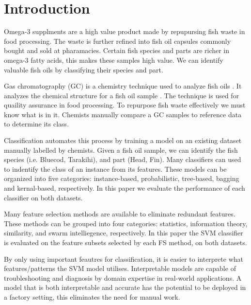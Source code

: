\documentclass[runningheads]{llncs}
\begin{document}
\section{Introduction}
\label{introduction}


Omega-3 supplments are a high value product made by repupursing fish waste in food processing. 
The waste is further refined into fish oil capsules commonly bought and sold at pharamacies. 
Certain fish species and parts are richer in omega-3 fatty acids, this makes these samples high value. 
We can identify valuable fish oils by classifying their species and part.

Gas chromatography (GC) is a chemistry technique used to analyze fish oils \cite{eder1995gas}. 
It analyzes the chemical structure for a fish oil sample \cite{restek2018high}. 
The technique is used for quaility assurance in food processing. 
To repurpose fish waste effectively we must know what is in it. 
Chemists manually compare a GC samples to reference data to determine its class. 

Classification automates this process by training a model on an existing dataset manually labelled by chemists. 
Given a fish oil sample, we can identify the fish species (i.e. Bluecod, Tarakihi), and part (Head, Fin).
Many classifiers \cite{fix1989discriminatory,hand2001idiot,ho1995random,loh2011classification,cortes1995support} can used to indentify the class of an instance from its features. 
These models can be organized into five categories: instance-based, probabilistic, tree-based, bagging and kernal-based, respectively. 
In this paper we evaluate the performance of each classifier on both datasets. 

Many feature selection methods \cite{liu1995chi2,ding2005minimum,kononenko1994estimating,kennedy1995particle} are available to eliminate redundant features. 
These methods can be grouped into four categories: statistics, information theory, similarity, and swarm intelliegence, respectively. 
In this paper the SVM classifier \cite{cortes1995support} is evaluated on the feature subsets selected by each FS method, on both datasets. 

By only using important feautres for classification, it is easier to interprete what features/patterns the SVM model utilises. 
Interpretable models are capable of troubleshooting and diagnosis by domain expertise in real-world applications.
A model that is both interpretable and accurate has the potential to be deployed in a factory setting, this eliminates the need for manual work.
\end{document}
